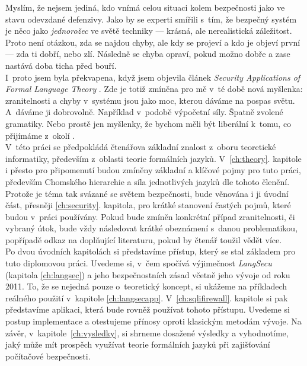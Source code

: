 Myslím, že nejsem jediná, kdo vnímá celou situaci kolem bezpečnosti jako ve stavu odevzdané defenzivy. Jako by se experti smířili s~tím, že bezpečný 
systém je něco jako \textit{jednorožec} ve světě techniky --- krásná, ale nerealistická záležitost. Proto není otázkou, zda se najdou chyby, ale kdy 
se projeví a kdo je objeví první --- zda ti dobří, nebo zlí. Následně se chyba opraví, pokud možno dobře a zase nastává doba ticha před bouří. \\

I~proto jsem byla překvapena, když jsem objevila článek \textit{Security Applications of Formal Language Theory} \cite{Sass2013}. Zde je totiž zmíněna 
pro mě v~té době nová myšlenka: zranitelnosti a chyby v~systému jsou jako moc, kterou dáváme na pospas světu. A~dáváme ji dobrovolně. Například v~podobě 
výpočetní síly. Špatně zvolené gramatiky. Nebo prostě jen myšlenky, že bychom měli být liberální k~tomu, co přijímáme z~okolí \cite[str. 1]{Geer2010}. \\

V~této práci se předpokládá čtenářova základní znalost z~oboru teoretické informatiky, především z~oblasti teorie formálních jazyků. V~\ref{ch:theory}. 
kapitole i přesto pro připomenutí budou zmíněny základní a klíčové pojmy pro tuto práci, především Chomského hierarchie a síla jednotlivých jazyků dle 
tohoto členění. Protože je téma tak svázané se světem bezpečnosti, bude věnována i ji úvodní část, přesněji \ref{ch:security}. kapitola, pro krátké 
stanovení častých pojmů, které budou v~práci používány. Pokud bude zmíněn konkrétní případ zranitelnosti, či vybraný útok, bude vždy následovat krátké 
obeznámení s~danou problematikou, popřípadě odkaz na doplňující literaturu, pokud by čtenář toužil vědět více. \\

Po dvou úvodních kapitolách si představíme přístup, který se stal základem pro tuto diplomovou práci. Uvedeme si, v~čem spočívá výjimečnost 
\textit{LangSecu} (kapitola \ref{ch:langsec}) a jeho bezpečnostních zásad včetně jeho vývoje od roku 2011. To, že se nejedná pouze o~teoretický koncept, 
si ukážeme na příkladech reálného použití v~kapitole \ref{ch:langsecapp}. V~\ref{ch:sqlifirewall}. kapitole si pak představíme aplikaci, která bude 
rovněž používat tohoto přístupu. Uvedeme si postup implementace a otestujeme přínosy oproti klasickým metodám vývoje. 
Na závěr, v~kapitole~\ref{ch:vysledky}, si shrneme dosažené výsledky a vyhodnotíme, jaký může mít prospěch využívat teorie formálních jazyků při 
zajišťování počítačové bezpečnosti. \\

